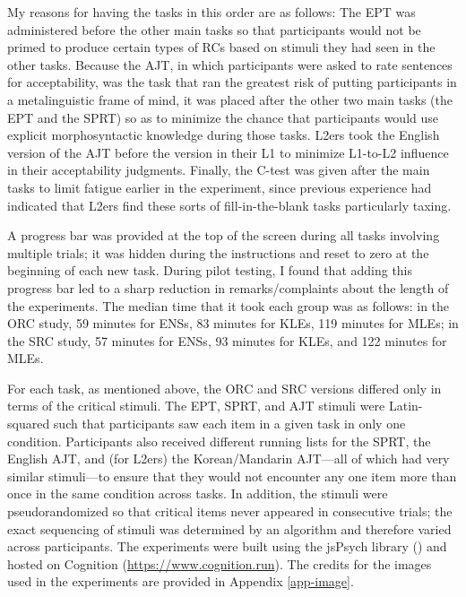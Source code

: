 My reasons for having the tasks in this order are as follows: The EPT was administered before the other main tasks so that participants would not be primed to produce certain types of RCs based on stimuli they had seen in the other tasks. Because the AJT, in which participants were asked to rate sentences for acceptability, was the task that ran the greatest risk of putting participants in a metalinguistic frame of mind, it was placed after the other two main tasks (the EPT and the SPRT) so as to minimize the chance that participants would use explicit morphosyntactic knowledge during those tasks. L2ers took the English version of the AJT before the version in their L1 to minimize L1-to-L2 influence in their acceptability judgments. Finally, the C-test was given after the main tasks to limit fatigue earlier in the experiment, since previous experience had indicated that L2ers find these sorts of fill-in-the-blank tasks particularly taxing.

A progress bar was provided at the top of the screen during all tasks involving multiple trials; it was hidden during the instructions and reset to zero at the beginning of each new task. During pilot testing,\footnotemark{} I found that adding this progress bar led to a sharp reduction in remarks/complaints about the length of the experiments. The median time that it took each group was as follows: in the ORC study, 59 minutes for ENSs, 83 minutes for KLEs, 119 minutes for MLEs; in the SRC study, 57 minutes for ENSs, 93 minutes for KLEs, and 122 minutes for MLEs.


For each task, as mentioned above, the ORC and SRC versions differed only in terms of the critical stimuli. The EPT, SPRT, and AJT stimuli were Latin-squared such that participants saw each item in a given task in only one condition. Participants also received different running lists for the SPRT, the English AJT, and (for L2ers) the Korean/Mandarin AJT---all of which had very similar stimuli---to ensure that they would not encounter any one item more than once in the same condition across tasks. In addition, the stimuli were pseudorandomized so that critical items never appeared in consecutive trials; the exact sequencing of stimuli was determined by an algorithm and therefore varied across participants. The experiments were built using the jsPsych library (\cite{deleeuw2015}) and hosted on Cognition (\url{https://www.cognition.run}). The credits for the images used in the experiments are provided in Appendix \ref{app-image}.

